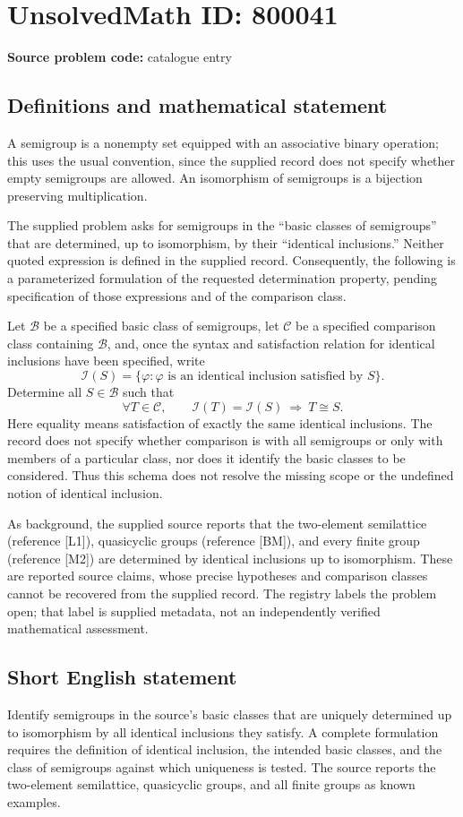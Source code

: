 \documentclass[11pt]{article}
\begin{document}
\section*{UnsolvedMath ID: 800041}
\textbf{Source problem code:} catalogue entry
\subsection{Definitions and mathematical statement}
A semigroup is a nonempty set equipped with an associative binary operation; this uses the usual convention, since the supplied record does not specify whether empty semigroups are allowed. An isomorphism of semigroups is a bijection preserving multiplication.

The supplied problem asks for semigroups in the ``basic classes of semigroups'' that are determined, up to isomorphism, by their ``identical inclusions.'' Neither quoted expression is defined in the supplied record. Consequently, the following is a parameterized formulation of the requested determination property, pending specification of those expressions and of the comparison class.

Let \(\mathcal{B}\) be a specified basic class of semigroups, let \(\mathcal{C}\) be a specified comparison class containing \(\mathcal{B}\), and, once the syntax and satisfaction relation for identical inclusions have been specified, write
\[
\mathcal{I}(S)=\{\varphi : \varphi\text{ is an identical inclusion satisfied by }S\}.
\]
Determine all \(S\in\mathcal{B}\) such that
\[
\forall T\in\mathcal{C},\qquad
\mathcal{I}(T)=\mathcal{I}(S)\ \Longrightarrow\ T\cong S.
\]
Here equality means satisfaction of exactly the same identical inclusions. The record does not specify whether comparison is with all semigroups or only with members of a particular class, nor does it identify the basic classes to be considered. Thus this schema does not resolve the missing scope or the undefined notion of identical inclusion.

As background, the supplied source reports that the two-element semilattice (reference [L1]), quasicyclic groups (reference [BM]), and every finite group (reference [M2]) are determined by identical inclusions up to isomorphism. These are reported source claims, whose precise hypotheses and comparison classes cannot be recovered from the supplied record. The registry labels the problem open; that label is supplied metadata, not an independently verified mathematical assessment.
\subsection{Short English statement}
Identify semigroups in the source's basic classes that are uniquely determined up to isomorphism by all identical inclusions they satisfy. A complete formulation requires the definition of identical inclusion, the intended basic classes, and the class of semigroups against which uniqueness is tested. The source reports the two-element semilattice, quasicyclic groups, and all finite groups as known examples.
\end{document}
